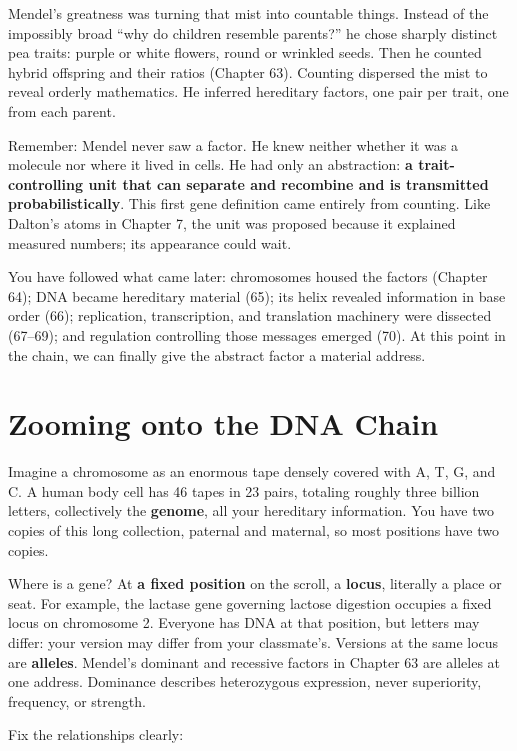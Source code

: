 Mendel's greatness was turning that mist into countable things. Instead of the impossibly broad ``why do children resemble parents?'' he chose sharply distinct pea traits: purple or white flowers, round or wrinkled seeds. Then he counted hybrid offspring and their ratios (Chapter 63). Counting dispersed the mist to reveal orderly mathematics. He inferred hereditary factors, one pair per trait, one from each parent.

Remember: Mendel never saw a factor. He knew neither whether it was a molecule nor where it lived in cells. He had only an abstraction: \textbf{a trait-controlling unit that can separate and recombine and is transmitted probabilistically}. This first gene definition came entirely from counting. Like Dalton's atoms in Chapter 7, the unit was proposed because it explained measured numbers; its appearance could wait.

You have followed what came later: chromosomes housed the factors (Chapter 64); DNA became hereditary material (65); its helix revealed information in base order (66); replication, transcription, and translation machinery were dissected (67--69); and regulation controlling those messages emerged (70). At this point in the chain, we can finally give the abstract factor a material address.

\section{Zooming onto the DNA Chain}

Imagine a chromosome as an enormous tape densely covered with A, T, G, and C. A human body cell has 46 tapes in 23 pairs, totaling roughly three billion letters, collectively the \textbf{genome}, all your hereditary information. You have two copies of this long collection, paternal and maternal, so most positions have two copies.

Where is a gene? At \textbf{a fixed position} on the scroll, a \textbf{locus}, literally a place or seat. For example, the lactase gene governing lactose digestion occupies a fixed locus on chromosome 2. Everyone has DNA at that position, but letters may differ: your version may differ from your classmate's. Versions at the same locus are \textbf{alleles}. Mendel's dominant and recessive factors in Chapter 63 are alleles at one address. Dominance describes heterozygous expression, never superiority, frequency, or strength.

Fix the relationships clearly:

